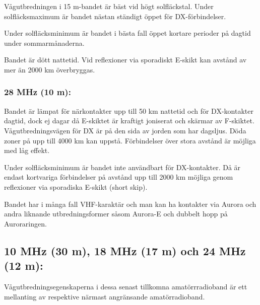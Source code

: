 Vågutbredningen i 15 m-bandet är bäst vid högt solfläckstal. Under
solfläcksmaximum är bandet nästan ständigt öppet för DX-förbindelser.

Under solfläcksminimum är bandet i bästa fall öppet kortare perioder
på dagtid under sommarmånaderna.

Bandet är dött nattetid. Vid reflexioner via sporadiskt E-skikt kan
avstånd av mer än 2000 km överbryggas.

\subsubsection{28 MHz (10 m):}

Bandet är lämpat för närkontakter upp till 50 km nattetid och för
DX-kontakter dagtid, dock ej dagar då E-skiktet är kraftigt joniserat
och skärmar av F-skiktet. Vågutbredningsvägen för DX är på den sida av
jorden som har dagsljus. Döda zoner på upp till 4000 km kan
uppstå. Förbindelser över stora avstånd är möjliga med låg effekt.

Under solfläcksminimum är bandet inte användbart för DX-kontakter. Då
är endast kortvariga förbindelser på avstånd upp till 2000 km möjliga
genom reflexioner via sporadiska E-skikt (short skip).

Bandet har i många fall VHF-karaktär och man kan ha kontakter via
Aurora och andra liknande utbredningsformer såsom Aurora-E och dubbelt
hopp på Auroraringen.

\subsection{10 MHz (30 m), 18 MHz (17 m) och 24 MHz (12 m):}

Vågutbredningsegenskaperna i dessa senast tillkomna amatörrradioband
är ett mellanting av respektive närmast angränsande amatörradioband.

